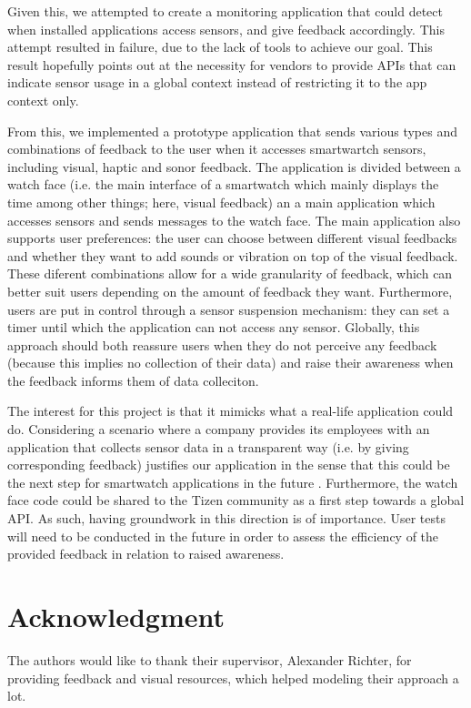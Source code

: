 \documentclass[conference, a4paper, 10pt, twocolumn]{IEEEtran}
\begin{document}
Given this, we attempted to create a monitoring application that could detect when installed applications access sensors, and give feedback accordingly. This attempt resulted in failure, due to the lack of tools to achieve our goal. This result hopefully points out at the necessity for vendors to provide \acp{API} that can indicate sensor usage in a global context instead of restricting it to the app context only. 

From this, we implemented a prototype application that sends various types and combinations of feedback to the user when it accesses smartwartch sensors, including visual, haptic and sonor feedback. The application is divided between a watch face (i.e. the main interface of a smartwatch which mainly displays the time among other things; here, visual feedback) an a main application which accesses sensors and sends messages to the watch face. The main application also supports user preferences: the user can choose between different visual feedbacks and whether they want to add sounds or vibration on top of the visual feedback. These diferent combinations allow for a wide granularity of feedback, which can better suit users depending on the amount of feedback they want. Furthermore, users are put in control through a sensor suspension mechanism: they can set a timer until which the application can not access any sensor. Globally, this approach should both reassure users when they do not perceive any feedback (because this implies no collection of their data) and raise their awareness when the feedback informs them of data colleciton.  

The interest for this project is that it mimicks what a real-life application could do. Considering a scenario where a company provides its employees with an application that collects sensor data in a transparent way (i.e. by giving corresponding feedback) justifies our application in the sense that this could be the next step for smartwatch applications in the future \cite{richter2020privacy}. Furthermore, the watch face code could be shared to the Tizen community as a first step towards a global \ac{API}. As such, having groundwork in this direction is of importance. User tests will need to be conducted in the future in order to assess the efficiency of the provided feedback in relation to raised awareness. 

\section*{Acknowledgment}
The authors would like to thank their supervisor, Alexander Richter, for providing feedback and visual resources, which helped modeling their approach a lot.

\printbibliography
\end{document}
